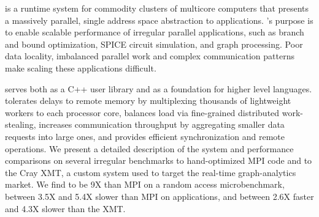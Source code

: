 \Grappa is a runtime system for commodity clusters of multicore computers that
presents a massively parallel, single address space abstraction to
applications. \Grappa's purpose is to enable scalable performance of irregular
parallel applications, such as  branch and bound optimization, SPICE circuit simulation, and graph processing. Poor data locality,
imbalanced parallel work and complex communication patterns make scaling these
applications difficult.

\Grappa serves both as a C++ user library and as a foundation for higher level
languages. \Grappa tolerates delays to remote memory by multiplexing thousands
of lightweight workers to each processor core, balances load via fine-grained
distributed work-stealing, increases communication throughput by aggregating
smaller data requests into large ones, and provides efficient synchronization
and remote operations. We present a detailed description of the \Grappa system
and performance comparisons on several irregular benchmarks to hand-optimized
MPI code and to the Cray XMT, a custom system used to target the real-time
graph-analytics market. We find \Grappa to be 9X than MPI on a random access microbenchmark, between 3.5X and 5.4X slower than MPI on applications, and between 2.6X faster
and 4.3X slower than the XMT.
